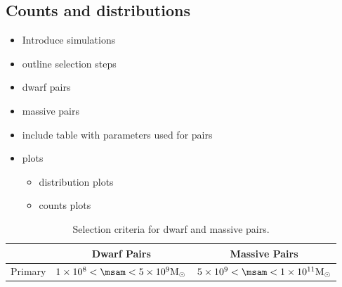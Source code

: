 \documentclass[twocolumn]{aastex631}
\begin{document}
\subsection{Counts and distributions}\label{sec:methods-counts}

\begin{itemize}
  \item Introduce simulations
  \item outline selection steps
  \item dwarf pairs
  \item massive pairs
  \item include table with parameters used for pairs
  \item plots
    \begin{itemize}
      \item distribution plots
      \item counts plots
    \end{itemize}
\end{itemize}


\begin{table}[htb]
  \centering
    \begin{tabular}{lcc}
     & Dwarf Pairs & Massive Pairs \\\hline\hline
    Primary &$1\times10^{8} < \msam < 5\times10^{9} \Msun$ & $5\times10^{9} < \msam < 1\times10^{11} \Msun$\\\hline
    \end{tabular}
    \caption{\label{table:mass}Selection criteria for dwarf and massive pairs.}
    \end{table}
\end{document}
